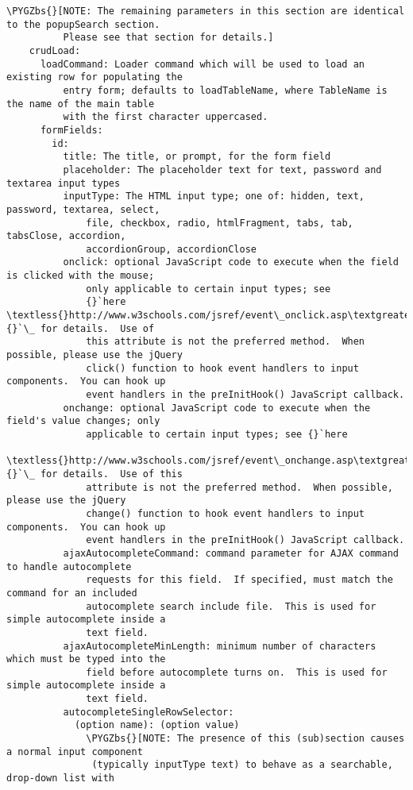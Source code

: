 \documentclass[letterpaper,10pt,english]{sphinxmanual}
\def\PYGZbs{\char`\\}
\begin{document}
\begin{Verbatim}[commandchars=\\\{\}]
      \PYGZbs{}[NOTE: The remaining parameters in this section are identical to the popupSearch section.
          Please see that section for details.]
    crudLoad:
      loadCommand: Loader command which will be used to load an existing row for populating the
          entry form; defaults to loadTableName, where TableName is the name of the main table
          with the first character uppercased.
      formFields:
        id:
          title: The title, or prompt, for the form field
          placeholder: The placeholder text for text, password and textarea input types
          inputType: The HTML input type; one of: hidden, text, password, textarea, select,
              file, checkbox, radio, htmlFragment, tabs, tab, tabsClose, accordion,
              accordionGroup, accordionClose
          onclick: optional JavaScript code to execute when the field is clicked with the mouse;
              only applicable to certain input types; see
              {}`here \textless{}http://www.w3schools.com/jsref/event\_onclick.asp\textgreater{}{}`\_ for details.  Use of
              this attribute is not the preferred method.  When possible, please use the jQuery
              click() function to hook event handlers to input components.  You can hook up
              event handlers in the preInitHook() JavaScript callback.
          onchange: optional JavaScript code to execute when the field's value changes; only
              applicable to certain input types; see {}`here
              \textless{}http://www.w3schools.com/jsref/event\_onchange.asp\textgreater{}{}`\_ for details.  Use of this
              attribute is not the preferred method.  When possible, please use the jQuery
              change() function to hook event handlers to input components.  You can hook up
              event handlers in the preInitHook() JavaScript callback.
          ajaxAutocompleteCommand: command parameter for AJAX command to handle autocomplete
              requests for this field.  If specified, must match the command for an included
              autocomplete search include file.  This is used for simple autocomplete inside a
              text field.
          ajaxAutocompleteMinLength: minimum number of characters which must be typed into the
              field before autocomplete turns on.  This is used for simple autocomplete inside a
              text field.
          autocompleteSingleRowSelector:
            (option name): (option value)
              \PYGZbs{}[NOTE: The presence of this (sub)section causes a normal input component
               (typically inputType text) to behave as a searchable, drop-down list with

\end{Verbatim}
\end{document}

